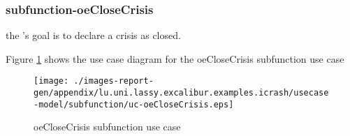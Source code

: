 
\subsubsection{subfunction-oeCloseCrisis}
\label{RE-use-case-oeCloseCrisis}



the 's goal is to declare a crisis as closed. 


\begin{usecase}
  









\end{usecase} 

Figure \ref{fig:lu.uni.lassy.excalibur.examples.icrash-lu.uni.lassy.excalibur.examples.icrash-RE-UCD-uc-oeCloseCrisis}
shows the use case diagram for the oeCloseCrisis subfunction use case

\begin{figure}[htbp]
\begin{center}

\texttt{[image: ./images-report-gen/appendix/lu.uni.lassy.excalibur.examples.icrash/usecase-model/subfunction/uc-oeCloseCrisis.eps]}
\end{center}
\caption[lu.uni.lassy.excalibur.examples.icrash Use Case Diagram: uc-oeCloseCrisis]{ oeCloseCrisis subfunction use case}
\label{fig:lu.uni.lassy.excalibur.examples.icrash-lu.uni.lassy.excalibur.examples.icrash-RE-UCD-uc-oeCloseCrisis}
\end{figure}
\vspace{0.5cm}
